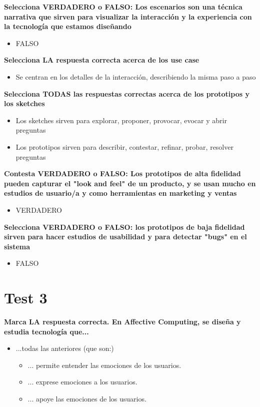 \documentclass[12pt]{report} %
\begin{document}
\textbf{Selecciona VERDADERO o FALSO: Los escenarios son una técnica narrativa que sirven para visualizar la interacción y la experiencia con la tecnología que estamos diseñando}
\begin{itemize}
  \item FALSO
\end{itemize}

\textbf{Selecciona LA respuesta correcta acerca de los use case}
\begin{itemize}
  \item Se centran en los detalles de la interacción, describiendo la misma paso a paso
\end{itemize}

\textbf{Selecciona TODAS las respuestas correctas acerca de los prototipos y los sketches}
\begin{itemize}
  \item Los sketches sirven para explorar, proponer, provocar, evocar y abrir preguntas
  \item Los prototipos sirven para describir, contestar, refinar, probar, resolver preguntas
\end{itemize}

\textbf{Contesta VERDADERO o FALSO: Los prototipos de alta fidelidad pueden capturar el "look and feel" de un producto, y se usan mucho en estudios de usuario/a y como herramientas en marketing y ventas}
\begin{itemize}
  \item VERDADERO
\end{itemize}

\textbf{Selecciona VERDADERO o FALSO: los prototipos de baja fidelidad sirven para hacer estudios de usabilidad y para detectar "bugs" en el sistema}
\begin{itemize}
  \item FALSO
\end{itemize}

\section{Test 3}

\textbf{Marca LA respuesta correcta. En Affective Computing, se diseña y estudia tecnología que...}
\begin{itemize}
  \item ...todas las anteriores (que son:)
  \begin{itemize}
    \item ... permite entender las emociones de los usuarios.
    \item ... exprese emociones a los usuarios.
    \item ... apoye las emociones de los usuarios.
  \end{itemize}
\end{itemize}
\end{document}
